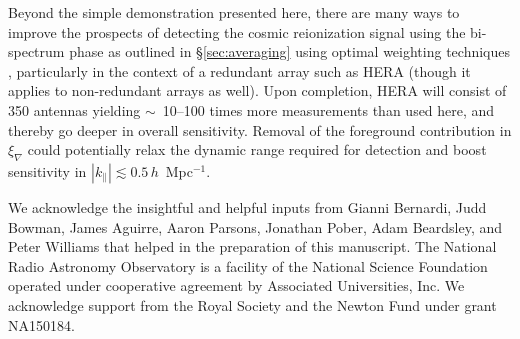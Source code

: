 \documentclass[
reprint,
superscriptaddress,
amsmath,
amssymb,
aps,
prd
]{revtex4-1}
\begin{document}
Beyond the simple demonstration presented here, there are many ways to improve the prospects of detecting the cosmic reionization signal using the bi-spectrum phase as outlined in \S\ref{sec:averaging} using optimal weighting techniques \cite{liu14a,liu14b,dil15}, particularly in the context of a redundant array such as HERA (though it applies to non-redundant arrays as well). Upon completion, HERA will consist of 350 antennas yielding $\sim$~10--100 times more measurements than used here, and thereby go deeper in overall sensitivity. Removal of the foreground contribution in $\xi_\nabla$ could potentially relax the dynamic range required for detection and boost sensitivity in $|k_\parallel| \lesssim 0.5\,h$~Mpc$^{-1}$. 

\begin{acknowledgments}
We acknowledge the insightful and helpful inputs from Gianni Bernardi, Judd Bowman, James Aguirre, Aaron Parsons, Jonathan Pober, Adam Beardsley, and Peter Williams that helped in the preparation of this manuscript. The National Radio Astronomy Observatory is a facility of the National Science Foundation operated under cooperative agreement by Associated Universities, Inc. We acknowledge support from the Royal Society and the Newton Fund under grant NA150184.
\end{acknowledgments}



\end{document}
